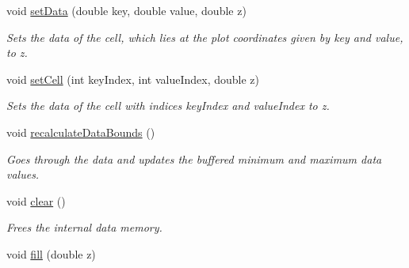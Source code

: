 \begin{DoxyCompactItemize}
void \hyperlink{classQCPColorMapData_afd2083ccfd6987ec94aa7ef8e91ca39a}{set\+Data} (double key, double value, double z)
\begin{DoxyCompactList}\small\item\em Sets the data of the cell, which lies at the plot coordinates given by {\itshape key} and {\itshape value}, to {\itshape z}. \end{DoxyCompactList}\item 
void \hyperlink{classQCPColorMapData_a8e75eaf8746596319032a93f3d2d0683}{set\+Cell} (int key\+Index, int value\+Index, double z)
\begin{DoxyCompactList}\small\item\em Sets the data of the cell with indices {\itshape key\+Index} and {\itshape value\+Index} to {\itshape z}. \end{DoxyCompactList}\item 
void \hyperlink{classQCPColorMapData_ab235ade8a4d64bd3adb26a99b3dd57ee}{recalculate\+Data\+Bounds} ()
\begin{DoxyCompactList}\small\item\em Goes through the data and updates the buffered minimum and maximum data values. \end{DoxyCompactList}\item 
void \hyperlink{classQCPColorMapData_a9910ba830e96955bd5c8e5bef1e77ef3}{clear} ()
\begin{DoxyCompactList}\small\item\em Frees the internal data memory. \end{DoxyCompactList}\item 
\hypertarget{classQCPColorMapData_a350f783260eb9b5de5c7b5e0d5d3e3c2}{}void \hyperlink{classQCPColorMapData_a350f783260eb9b5de5c7b5e0d5d3e3c2}{fill} (double z)\label{classQCPColorMapData_a350f783260eb9b5de5c7b5e0d5d3e3c2}


\end{DoxyCompactItemize}
